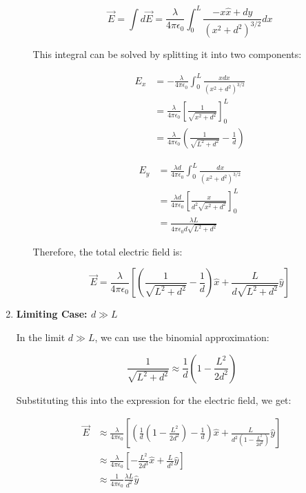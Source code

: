 \documentclass{article}
\begin{document}
\begin{enumerate}
\begin{enumerate}
    \[\vec{E} = \int d\vec{E} = \frac{\lambda}{4\pi\epsilon_0} \int_0^L \frac{-x\hat{x} + d\hat{y}}{(x^2 + d^2)^{3/2}} dx\]

    This integral can be solved by splitting it into two components:

    \begin{align*}
    E_x &= -\frac{\lambda}{4\pi\epsilon_0} \int_0^L \frac{x dx}{(x^2 + d^2)^{3/2}} \\
    &= \frac{\lambda}{4\pi\epsilon_0} \left[\frac{1}{\sqrt{x^2 + d^2}}\right]_0^L \\
    &= \frac{\lambda}{4\pi\epsilon_0} \left(\frac{1}{\sqrt{L^2 + d^2}} - \frac{1}{d}\right)
    \end{align*}

    \begin{align*}
    E_y &= \frac{\lambda d}{4\pi\epsilon_0} \int_0^L \frac{dx}{(x^2 + d^2)^{3/2}} \\
    &= \frac{\lambda d}{4\pi\epsilon_0} \left[\frac{x}{d^2 \sqrt{x^2 + d^2}}\right]_0^L \\
    &= \frac{\lambda L}{4\pi\epsilon_0 d \sqrt{L^2 + d^2}}
    \end{align*}

    Therefore, the total electric field is:

    \[\vec{E} = \frac{\lambda}{4\pi\epsilon_0} \left[\left(\frac{1}{\sqrt{L^2 + d^2}} - \frac{1}{d}\right)\hat{x} + \frac{L}{d \sqrt{L^2 + d^2}}\hat{y}\right]\]

\end{enumerate}

\item \textbf{Limiting Case: \(d \gg L\)}

In the limit \(d \gg L\), we can use the binomial approximation:

\[\frac{1}{\sqrt{L^2 + d^2}} \approx \frac{1}{d} \left(1 - \frac{L^2}{2d^2}\right)\]

Substituting this into the expression for the electric field, we get:

\begin{align*}
\vec{E} &\approx \frac{\lambda}{4\pi\epsilon_0} \left[\left(\frac{1}{d} \left(1 - \frac{L^2}{2d^2}\right) - \frac{1}{d}\right)\hat{x} + \frac{L}{d^2 \left(1 - \frac{L^2}{2d^2}\right)}\hat{y}\right] \\
&\approx \frac{\lambda}{4\pi\epsilon_0} \left[-\frac{L^2}{2d^3}\hat{x} + \frac{L}{d^2}\hat{y}\right] \\
&\approx \frac{1}{4\pi\epsilon_0} \frac{\lambda L}{d^2} \hat{y}
\end{align*}


\end{enumerate}
\end{document}
